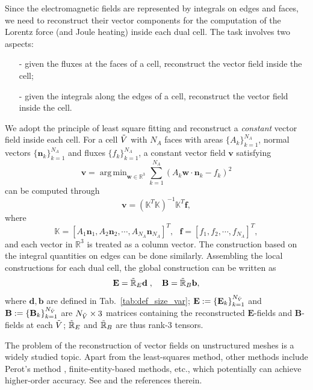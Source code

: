 \documentclass{article}
\DeclareMathOperator*{\argmin}{arg\,min}
\begin{document}
Since the electromagnetic fields are represented by integrals on edges and faces, we need
to reconstruct their vector components for the computation of the Lorentz force (and Joule
heating) inside each dual cell. The task involves two aspects:
\begin{itemize}
    \item[-] given the fluxes at the faces of a cell, reconstruct the vector field inside the cell;
    \item[-] given the integrals along the edges of a cell, reconstruct the vector field inside the cell. 
\end{itemize}
We adopt the principle of least square fitting and reconstruct a \emph{constant} vector
field inside each cell. For a cell $\Tilde{V}$ with $N_A$ faces with areas
$\{A_k\}_{k=1}^{N_A}$, normal vectors $\{\mathbf{n}_k\}_{k=1}^{N_A}$ and fluxes
$\{f_k\}_{k=1}^{N_A}$, a constant vector field $\mathbf{v}$ satisfying
\begin{equation*}
    \mathbf{v} = \argmin_{\mathbf{w}\in \mathbb{R}^3} \sum_{k=1}^{N_A}(A_k\mathbf{w} \cdot \mathbf{n}_k - f_k)^2   
\end{equation*} can be computed through
\begin{equation*}
    \mathbf{v} = (\mathbb{K}^T\mathbb{K})^{-1}\mathbb{K}^T\mathbf{f},
\end{equation*}
where
\begin{equation*}
    \mathbb{K} = [A_1\mathbf{n}_1, A_2\mathbf{n}_2, \cdots, A_{N_A}\mathbf{n}_{N_A}]^T,\ \ \ \mathbf{f} = [f_1, f_2, \cdots, f_{N_A}]^T,
\end{equation*}
and each vector in $\mathbb{R}^3$ is treated as a column vector. The construction based on
the integral quantities on edges can be done similarly. Assembling the local constructions
for each dual cell, the global construction can be written as
\begin{equation}
    \mathbf{E} = \Tilde{\mathbb{R}}_E\mathbf{d}\;,
    \quad
    \mathbf{B} = \Tilde{\mathbb{R}}_B\mathbf{b},
    \label{equ:reconstruction}
\end{equation}
where $\mathbf{d}, \mathbf{b}$ are defined in Tab.~\ref{tab:def_size_var};
$\mathbf{E} := \{\mathbf{E}_k\}_{k=1}^{N_{\Tilde{V}}}$ and
$\mathbf{B} := \{\mathbf{B}_k\}_{k=1}^{N_{\Tilde{V}}}$ are $N_{\Tilde{V}} \times 3$
matrices containing the reconstructed $\mathbf{E}$-fields and $\mathbf{B}$-fields at each
$\Tilde{V}$; $\Tilde{\mathbb{R}}_E$ and $\Tilde{\mathbb{R}}_B$ are thus rank-3 tensors.

The problem of the reconstruction of vector fields on unstructured meshes is a widely
studied topic. Apart from the least-squares method, other methods include Perot's method
\citep{perot_2000}, finite-entity-based methods, etc., which potentially can achieve
higher-order accuracy. See \cite[][Sec.~3.4.4]{fuchs_2021} and the references therein.
\end{document}
